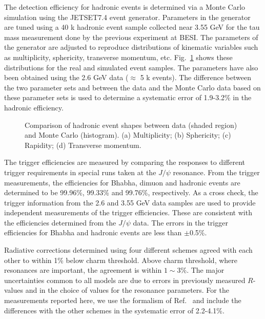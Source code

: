 The detection efficiency for hadronic events is determined via a Monte
Carlo simulation using the JETSET7.4 event generator\cite{11}.
Parameters in the generator are tuned \cite{qi} using a 40 k
hadronic event sample collected near 3.55 GeV for the tau mass measurement
done by the previous 
experiment at BESI\cite{12}.  The parameters of the generator are adjusted to
reproduce distributions of kinematic variables such as multiplicity,
sphericity, transverse momentum, etc.  Fig.~\ref{fig:lund} shows these
distributions for the real and simulated event samples.
The parameters have also been obtained using the 2.6 GeV data ($\approx$ 5
k events).  The difference between the two parameter sets and between
the data and the Monte Carlo data based on these parameter sets is
used to determine a systematic error of 1.9-3.2\% in the hadronic
efficiency.
 
\begin{figure}[htb]
\epsfysize=2.4in
\centerline{}
\caption{Comparison of hadronic event shapes between data (shaded
region) and Monte Carlo (histogram).  (a) Multiplicity; (b) Sphericity;
(c) Rapidity; (d) Transverse momentum.}
\label{fig:lund}
\end{figure}

The trigger efficiencies are measured
by comparing the
responses to different trigger requirements
in special runs taken at the $J/\psi$ resonance.
From the trigger 
measurements, the efficiencies
for Bhabha, dimuon and hadronic events are
determined to be 99.96\%, 99.33\% and 99.76\%,
respectively. As a cross check, the trigger information
from the 2.6 and 3.55 GeV data samples
are used to provide independent measurements of
the trigger efficiencies.
These are consistent with the efficiencies determined from
the $J/\psi$ data.
The errors in the
trigger efficiencies for Bhabha and hadronic events
are less than $\pm$0.5\%.



Radiative corrections determined using four different
schemes \cite{13,14,15,24} agreed with each other to within 1\%
below charm threshold.  Above charm threshold, where resonances are
important, the agreement is within $1\sim3\%$.  The major uncertainties
common to all models are due to errors in previously measured
$R$-values and in the choice of values
for the resonance parameters. For the measurements
reported here, we
use the formalism of Ref.~\cite{15} and include the differences with
the other schemes in the systematic error of 2.2-4.1\%.

